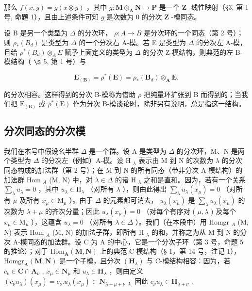 那么 \(f(x, y) = g(x \otimes y)\) ，其中 \(g: \mathbf{M} \otimes_{\mathbf{A}} \mathbf{N} \to \mathbf{P}\) 是一个 \(\mathbf{Z}\) -线性映射（§3, 第 1 号, 命题 1），且由上述条件可知 \(g\) 是次数为 0 的分次 \(\mathbf{Z}\) -模同态。

设 B 是另一个类型为 \(\Delta\) 的分次环， \(\rho: A \to B\) 是分次环的一个同态（第 2 号）；则 \(\rho_*(B_d)\) 是类型为 \(\Delta\) 的一个分次右 A-模。若 E 是类型为 \(\Delta\) 的分次左 A-模，且给 \(\rho^*(B_d) \otimes_A E\) 赋予上面定义的类型为 \(\Delta\) 的分次 Z-模结构，则典范的左 B-模结构（ \(\S\) 5, 第 1 号）与

\[
\mathbf {E} _ {(\mathbf {B})} = \rho^ {*} (\mathbf {E}) = \rho_ {*} (\mathbf {B} _ {d}) \otimes_ {\mathbf {A}} \mathbf {E}.
\]

的分次相容。这样得到的分次 B-模称为借助 \(\rho\) 把纯量环扩张到 B 而得到的；当我们把 \(\mathrm{E}_{(\mathrm{B})}\) 或 \(\rho^{*}(\mathrm{E})\) 作为分次 B-模谈论时，除非另有说明，总是指这一结构。

\subsection{分次同态的分次模}

我们在本号中假设幺半群 \(\Delta\) 是一个群。设 A 是类型为 \(\Delta\) 的分次环，M、N 是两个类型为 \(\Delta\) 的分次左（例如）A-模。设 H \(_{\lambda}\) 表示由 M 到 N 的次数为 \(\lambda\) 的分次同态构成的加法群（第 2 号）；在 M 到 N 的所有同态（带非分次 A-模结构）的加法群 Hom \(_{A}\) (M, N) 中，对 \(\lambda \in \Delta\) 的诸 H \(_{\lambda}\) 之和是直和。因为，若有一个关系 \(\sum_{\lambda} u_{\lambda} = 0\) ，其中 \(u_{\lambda} \in \mathrm{H}_{\lambda}\) （对所有 \(\lambda\) ），则由此得出 \(\sum_{\lambda} u_{\lambda}(x_{\mu}) = 0\) （对所有 \(\mu\) 及所有 \(x_{\mu} \in \mathrm{M}_{\mu}\) ）。由于 \(\Delta\) 的元素都可消去， \(u_{\lambda}(x_{\mu})\) 是 \(\sum_{\lambda} u_{\lambda}(x_{\mu})\) 的次数为 \(\lambda + \mu\) 的齐次分量；因此 \(u_{\lambda}(x_{\mu}) = 0\) （对每个有序对 ( \(\mu, \lambda\) ) 及每个 \(x_{\mu} \in \mathrm{M}_{\mu}\) ），这蕴含 \(u_{\lambda} = 0\) （对所有 \(\lambda \in \Delta\) ）。我们（在本段中）用 Homgr \(_{A}\) (M, N) 表示 Hom \(_{A}\) (M, N) 的加法子群，即所有 H \(_{\lambda}\) 的和，并称之为从 M 到 N 的分次 A-模同态的加法群。设 C 为 A 的中心，它是一个分次子环（第 3 号，命题 5 的推论）；对于 \(\mathrm{Hom}_{\mathbf{A}}(\mathbf{M},\mathbf{N})\) 上的典范 C-模结构（§ 1，第 14 号，注记 1）， \(\mathrm{Homgr}_{\mathbf{A}}(\mathbf{M},\mathbf{N})\) 是一个子模，且分次 \((\mathbf{H}_{\lambda})\) 与 C-模结构相容：因为，若 \(c_{\nu}\in \mathbf{C}\cap \mathbf{A}_{\nu}\) , \(x_{\mu}\in \mathbf{N}_{\mu}\) 和 \(u_{\lambda}\in \mathbf{H}_{\lambda}\) ，则由定义 \((c_{\nu}u_{\lambda})(x_{\mu}) = c_{\nu}.u_{\lambda}(x_{\mu})\subset \mathbf{N}_{\lambda +\mu +\nu}\) ，因此 \(c_{\nu}u_{\lambda}\in \mathbf{H}_{\lambda +\nu}\) .

